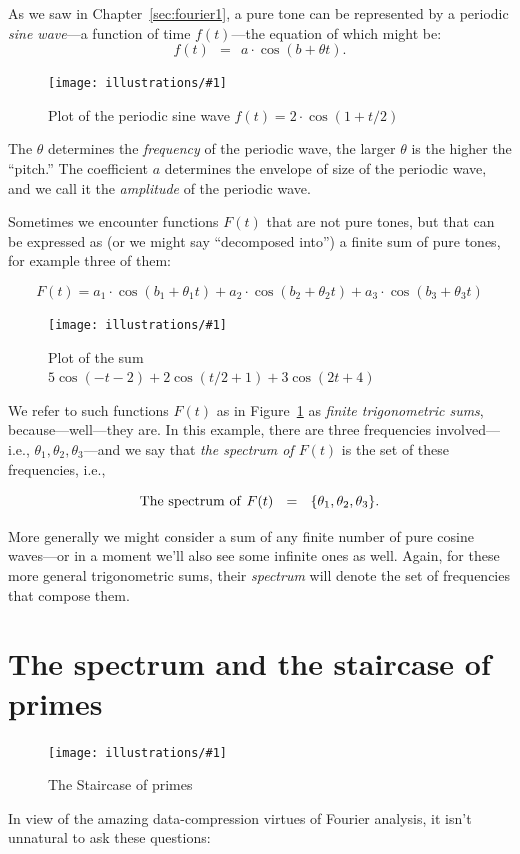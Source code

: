 \documentclass[openany]{book}
\newcommand{\ill}[3]{%
   \begin{figure}[H]%
   \vspace{-2ex}
   \centering%
   \texttt{[image: illustrations/\#1]}%
   \caption{#3}%
   \vspace{-2ex}
    \end{figure}}
\theoremstyle{plain}
\theoremstyle{definition}
\begin{document}
{As we saw in Chapter~\ref{sec:fourier1}, a pure tone can be represented by a periodic {\it sine wave}---a function of  time $f(t)$---the equation of which might be:
$$f(t)\ \ = \ \ a\cdot \cos(b +\theta t).$$

\ill{pure_tone}{.7}{Plot of the periodic sine wave $f(t) = 2\cdot \cos(1+t/2)$}

The $\theta$ determines the {\it frequency} of the periodic wave, the
larger $\theta$ is the higher the ``pitch.''  The coefficient $a$
determines the envelope of size of the periodic wave, and we call it
the {\it amplitude} of the periodic wave.

Sometimes we encounter functions $F(t)$ that are not pure tones, but
that can be expressed as (or we might say ``decomposed into'') a finite
sum of pure tones, for example three of them:

$$F(t)  = a_1\cdot \cos(b_1 +\theta_1 t) + a_2\cdot \cos(b_2 +\theta_2 t) + a_3\cdot \cos(b_3 +\theta_3 t)$$

\ill{mixed_tone3}{.7}{Plot of the sum $5  \cos\left(-t - 2\right) + 2 \cos\left(t/2 + 1\right) + 3  \cos\left(2  t + 4\right)$\label{fig:mixed_tone3}}

We refer to such functions $F(t)$ as in Figure~\ref{fig:mixed_tone3}
as {\it finite trigonometric
  sums}, because---well---they are.  In this example, there are three
frequencies involved---i.e., $\theta_1,\theta_2,\theta_3$---and we
say that {\it the spectrum of $F(t)$} is the set of these frequencies,
i.e.,

$$
  {\rm The\ spectrum \ of \ } F(t) \ \ = \ \ \{\theta_1,\theta_2,\theta_3\}.
$$

More generally we might consider a sum of any finite number of pure
cosine waves---or in a moment we'll also see some infinite ones as
well. Again, for these more general trigonometric sums, their {\it
  spectrum} will denote the set of frequencies that compose them.

\chapter{The spectrum and the staircase of primes\label{sec:fourier_staircase}}

\ill{prime_pi_100_aspect1}{0.95}{The Staircase of primes\label{fig:staircase100}}


In view of the amazing data-compression virtues of Fourier analysis,
it isn't unnatural to ask these questions:

}
\end{document}
